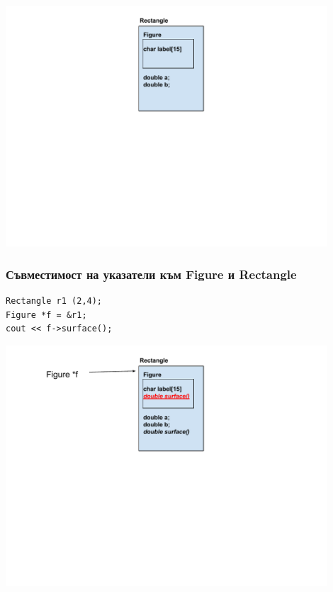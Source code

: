 \documentclass{beamer}
\begin{document}
\begin{frame}[fragile]
\begin{columns}[t]
\begin{column}{0.5\textwidth}
  \end{column}
\end{columns}

\begin{center}
\includegraphics[width=12.0cm]{images/inmem_rectangle}
\end{center}


\end{frame}




\begin{frame}[fragile]
\frametitle{Съвместимост на указатели към Figure и Rectangle}


\begin{flushleft}
\begin{lstlisting}
Rectangle r1 (2,4);
Figure *f = &r1;
cout << f->surface();
\end{lstlisting}
\end{flushleft}

\begin{center}
\includegraphics[width=12.0cm]{images/inmen_rect_withptr_r1}
\end{center}


\end{frame}
\end{document}
